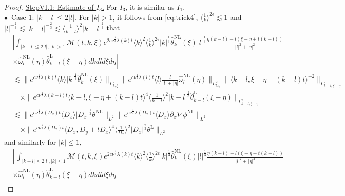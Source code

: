 \documentclass[reqno, 12pt]{amsart} %
\theoremstyle{plain} %
\theoremstyle{definition}
\theoremstyle{remark}
\numberwithin{equation}{section} %
\newcommand{\no}{\nonumber}
\newcommand{\lt}{\left}
\newcommand{\rt}{\right}
\begin{document}
\begin{proof}
		\underline{ StepVI.1: Estimate of $  I_3$.}      
		For $I_3$, it is similar as $I_1$. \\
		$\bullet$~Case 1: $|k-l| \leq 2|l|$. For $|k|>1$,  it follows from \eqref{eq:trick4}, $\langle \frac1k \rangle^{2\epsilon} \lesssim 1$ and $|l|^{-\frac23} \lesssim |k-l|^{-\frac23} \lesssim \langle\frac{1}{k-l}\rangle^2 |k-l|^{\frac{2}{3}} $ that
		\begin{align} \label{eq:temp30}
			& \left| \int_{|k-l| \leq 2|l|,\,|k|>1} \mathcal{M}(t, k, \xi) e^{2 c \nu^{\frac{1}{3}} \lambda(k) t}\langle k\rangle^2\langle\frac{1}{k}\rangle^{2 \epsilon} |k|^\frac13\hat{\theta}_k^{\mathrm{NL}}(\xi) |l|^\frac13  \frac{\eta(k-l)-l(\xi-\eta+t(k-l))}{|l|^2+|\eta|^2}\right. \no\\
			& \lt. \times \hat{\omega}_l^{\mathrm{NL}}(\eta) \hat{\theta}_{k-l}^{\mathrm{L}}(\xi-\eta) d k d l d \xi d \eta \rt| \no \\
			& \lesssim\|e^{c \nu^{\frac{1}{3}} \lambda(k) t}\langle k\rangle |k|^\frac13  \hat{\theta}_k^{\mathrm{NL}}(\xi)\|_{L_{k, \xi}^2}\|e^{c \nu^{\frac{1}{3}} \lambda(l) t}\langle l\rangle \frac{l}{|l|+|\eta|} \hat{\omega}_l^{\mathrm{NL}}(\eta)\|_{L_{l, \eta}^2}\|\langle k-l, \xi-\eta+(k-l) t\rangle^{-2}\|_{L_{k-l, \xi-\eta}^2} \no\\
			& \quad \times\|e^{c \nu^{\frac{1}{3}} \lambda(k-l) t}\langle k-l, \xi-\eta+(k-l) t\rangle^4\langle\frac{1}{k-l}\rangle^2|k-l|^{\frac{2}{3}} \hat{\theta}_{k-l}^{\mathrm{L}}(\xi-\eta)\|_{L_{k-l, \xi-\eta}^2} \no\\
			& \lesssim\|e^{c \nu^{\frac{1}{3}} \lambda\left(D_x\right) t}\langle D_x\rangle  |D_x|^\frac13  \theta^{\mathrm{NL}}\|_{L^2}\|e^{c \nu^{\frac{1}{3}} \lambda\left(D_x\right) t}\langle D_x\rangle \partial_x \nabla \phi^{\mathrm{NL}}\|_{L^2} \no \\
			& \quad \times\|e^{c \nu^{\frac{1}{3}} \lambda\left(D_x\right) t}\langle D_x, D_y+t D_x\rangle^4\langle\frac{1}{D_x}\rangle^2\left|D_x\right|^{\frac{2}{3}} \theta^{\mathrm{L}}\|_{L^2}
		\end{align}
		and similarly for $|k| \leq 1$,
		\begin{align} \label{eq:temp31}
			& \left\lvert\, \int_{|k-l| \leq 2|l|,|k| \leq 1} \mathcal{M}(t, k, \xi) e^{2 c \nu^{\frac{1}{3}} \lambda(k) t}\langle k\rangle^2\langle\frac{1}{k}\rangle^{2 \epsilon} |k|^\frac13\hat{\theta}_k^{\mathrm{NL}}(\xi) |l|^\frac13  \frac{\eta(k-l)-l(\xi-\eta+t(k-l))}{|l|^2+|\eta|^2}\right. \no\\
			& \times \hat{\omega}_l^{\mathrm{NL}}(\eta) \hat{\theta}_{k-l}^{\mathrm{L}}(\xi-\eta) d k d l d \xi d \eta \mid \no \\

\end{align}
\end{proof}
\end{document}
